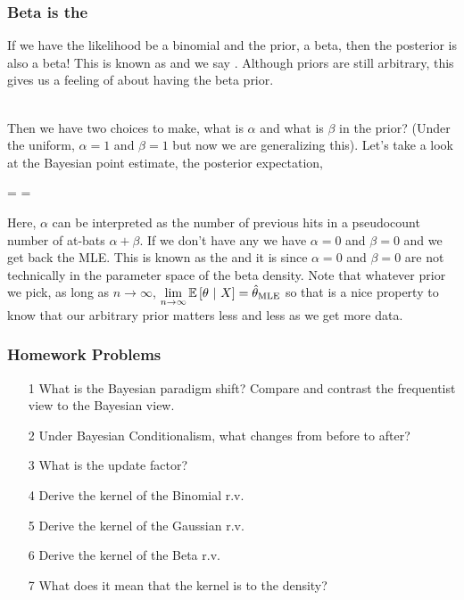 \documentclass[slides]{beamer} %
\begin{document}
\begin{frame}
	\frametitle{Beta is the }
	
\scriptsize
If we have the likelihood be a binomial \pause and the prior, a beta, \pause then the posterior is also a beta! \pause This is known as  and we say . \pause  Although priors are still arbitrary, this gives us a feeling of  about having the beta prior. \\~\\\pause 

Then we have two choices to make, what is $\alpha$ and what is $\beta$ in the prior? \pause (Under the uniform, $\alpha = 1$ and $\beta = 1$ but now we are generalizing this). \pause  Let's take a look at the Bayesian point estimate, the posterior expectation, \pause 

\beqn
{} =  \pause \neq  {} = \thetahatmle
\eeqn\pause 

Here, $\alpha$ can be interpreted as the  number of previous hits \pause in a pseudocount number of at-bats $\alpha + \beta$. \pause  If we don't have any  we have $\alpha = 0$ and $\beta = 0$ and we get back the MLE. \pause This is known as the  \pause and it is  \pause since $\alpha = 0$ and $\beta = 0$ are not technically in the parameter space of the beta density. \pause Note that whatever prior we pick, as long as $n \rightarrow \infty$, $\displaystyle \lim_{n \rightarrow \infty} \mathbb{E}\left[\theta ~ | ~ X\right] = \hat{\theta}_{\mathrm{MLE}}$ \pause so that is a nice property to know that our arbitrary prior matters less and less as we get more data.

\end{frame}


\begin{frame}
	\frametitle{Homework Problems}
\begin{enumerate}
\item[1] What is the Bayesian paradigm shift? Compare and contrast the frequentist view to the Bayesian view.
\item[2] Under Bayesian Conditionalism, what changes from before to after?
\item[3] What is the update factor?
\item[4] Derive the kernel of the Binomial r.v.
\item[5] Derive the kernel of the Gaussian r.v.
\item[6] Derive the kernel of the Beta r.v.
\item[7] What does it mean that the kernel is  to the density?
\end{enumerate}
\end{frame}	
\end{document}
